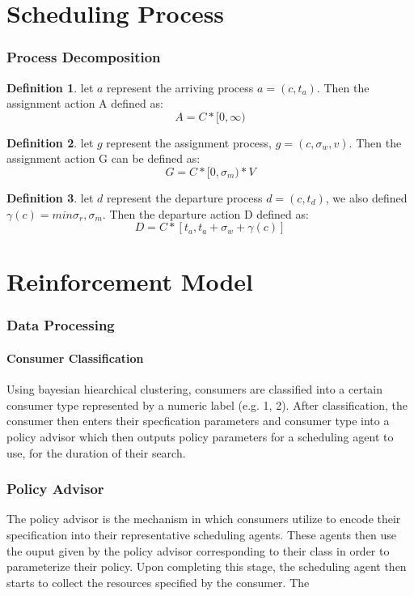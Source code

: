 \documentclass{article}
\theoremstyle{definition}
\newtheorem{definition}{Definition}[section]
\theoremstyle{remark}
\begin{document}
	\part{Scheduling Process}
	
	\section{Process Decomposition}
	
		\begin{definition}
			let $a$ represent the arriving process $a = (c, t_a)$. Then the assignment action A defined as:
			\[
			A = C * [0, \infty)
			\]
		\end{definition}
		
		\begin{definition}
			let $g$ represent the assignment process, $g = (c,\sigma_w, v)$. Then the assignment action G can be defined as:
			\[
			G = C*[0,\sigma_m)*V
			\]
		\end{definition}
		
		\begin{definition}
			let $d$ represent the departure process $d = (c, t_d)$, we also defined $\gamma(c) = min{\sigma_r,\sigma_m}.$ Then the
            departure action D defined as:
			\[
			D = C * [t_a, t_a + \sigma_w + \gamma(c)]
			\]
		\end{definition}
	
	\newpage
	
	\part{Reinforcement Model}
	
	\section{Data Processing}
	
	\subsection{Consumer Classification}
	Using bayesian hiearchical clustering, consumers are classified into a certain consumer type represented by a
    numeric label (e.g. 1, 2). After classification, the consumer then enters their specfication parameters and
    consumer type into a policy advisor which then outputs policy parameters for a scheduling agent to use, for
    the duration of their search.
	
	\section{Policy Advisor}
	The policy advisor is the mechanism in which consumers utilize to encode their specification into their
    representative scheduling agents. These agents then use the ouput given by the policy advisor corresponding
    to their class in order to parameterize their policy. Upon completing this stage, the scheduling agent
    then starts to collect the resources specified by the consumer. The
\end{document}
